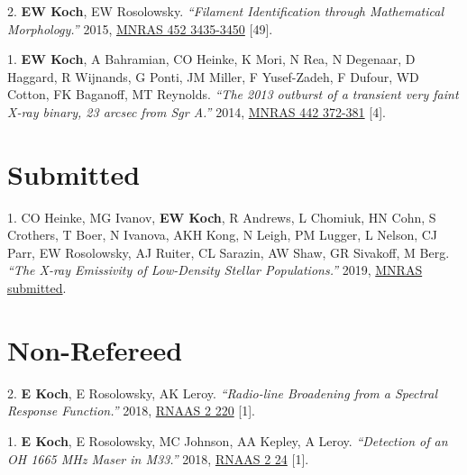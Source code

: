 \documentclass[letterpaper,11pt]{article}
\newenvironment{publist}{
  \begingroup
  \raggedright
  \begin{description}[leftmargin=4ex,style=sameline]
}{
  \end{description}
  \endgroup
}
\begin{document}
\begin{publist}
\item[2.] \textbf{EW Koch}, EW Rosolowsky. \textit{``Filament Identification through Mathematical Morphology.''} 2015, \href{http://adsabs.harvard.edu/abs/2015MNRAS.452.3435K}{MNRAS 452 3435-3450} [49].
\item[1.] \textbf{EW Koch}, A Bahramian, CO Heinke, K Mori, N Rea, N Degenaar, D Haggard, R Wijnands, G Ponti, JM Miller, F Yusef-Zadeh, F Dufour, WD Cotton, FK Baganoff, MT Reynolds. \textit{``The 2013 outburst of a transient very faint X-ray binary, 23 arcsec from Sgr A\textasteriskcentered.''} 2014, \href{http://adsabs.harvard.edu/abs/2014MNRAS.442..372K}{MNRAS 442 372-381} [4].
\end{publist}

\section*{Submitted}

\begin{publist}
\item[1.] CO Heinke, MG Ivanov, \textbf{EW Koch}, R Andrews, L Chomiuk, HN Cohn, S Crothers, T Boer, N Ivanova, AKH Kong, N Leigh, PM Lugger, L Nelson, CJ Parr, EW Rosolowsky, AJ Ruiter, CL Sarazin, AW Shaw, GR Sivakoff, M Berg. \textit{``The X-ray Emissivity of Low-Density Stellar Populations.''} 2019, \href{http://adsabs.harvard.edu/abs/None}{MNRAS submitted}.
\end{publist}

\section*{Non-Refereed}

\begin{publist}
\item[2.] \textbf{E Koch}, E Rosolowsky, AK Leroy. \textit{``Radio-line Broadening from a Spectral Response Function.''} 2018, \href{http://adsabs.harvard.edu/abs/2018RNAAS...2d.220K}{RNAAS 2 220} [1].
\item[1.] \textbf{E Koch}, E Rosolowsky, MC Johnson, AA Kepley, A Leroy. \textit{``Detection of an OH 1665 MHz Maser in M33.''} 2018, \href{http://adsabs.harvard.edu/abs/2018RNAAS...2a..24K}{RNAAS 2 24} [1].
\end{publist}
\end{document}
